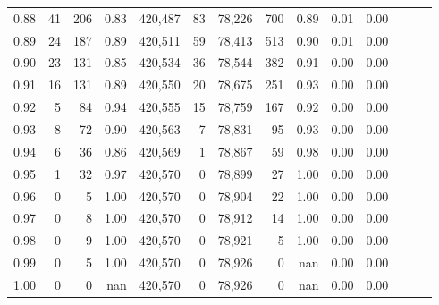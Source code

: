 \begin{tabular}{rrrrrrrrrrrrrr}
0.88 &      41 &    206 &  0.83 &  420,487 &       83 &  78,226 &     700 &  0.89 &  0.01 &      0.00 \\
0.89 &      24 &    187 &  0.89 &  420,511 &       59 &  78,413 &     513 &  0.90 &  0.01 &      0.00 \\
0.90 &      23 &    131 &  0.85 &  420,534 &       36 &  78,544 &     382 &  0.91 &  0.00 &      0.00 \\
0.91 &      16 &    131 &  0.89 &  420,550 &       20 &  78,675 &     251 &  0.93 &  0.00 &      0.00 \\
0.92 &       5 &     84 &  0.94 &  420,555 &       15 &  78,759 &     167 &  0.92 &  0.00 &      0.00 \\
0.93 &       8 &     72 &  0.90 &  420,563 &        7 &  78,831 &      95 &  0.93 &  0.00 &      0.00 \\
0.94 &       6 &     36 &  0.86 &  420,569 &        1 &  78,867 &      59 &  0.98 &  0.00 &      0.00 \\
0.95 &       1 &     32 &  0.97 &  420,570 &        0 &  78,899 &      27 &  1.00 &  0.00 &      0.00 \\
0.96 &       0 &      5 &  1.00 &  420,570 &        0 &  78,904 &      22 &  1.00 &  0.00 &      0.00 \\
0.97 &       0 &      8 &  1.00 &  420,570 &        0 &  78,912 &      14 &  1.00 &  0.00 &      0.00 \\
0.98 &       0 &      9 &  1.00 &  420,570 &        0 &  78,921 &       5 &  1.00 &  0.00 &      0.00 \\
0.99 &       0 &      5 &  1.00 &  420,570 &        0 &  78,926 &       0 &   nan &  0.00 &      0.00 \\
1.00 &       0 &      0 &   nan &  420,570 &        0 &  78,926 &       0 &   nan &  0.00 &      0.00 \\
\bottomrule
\end{tabular}
